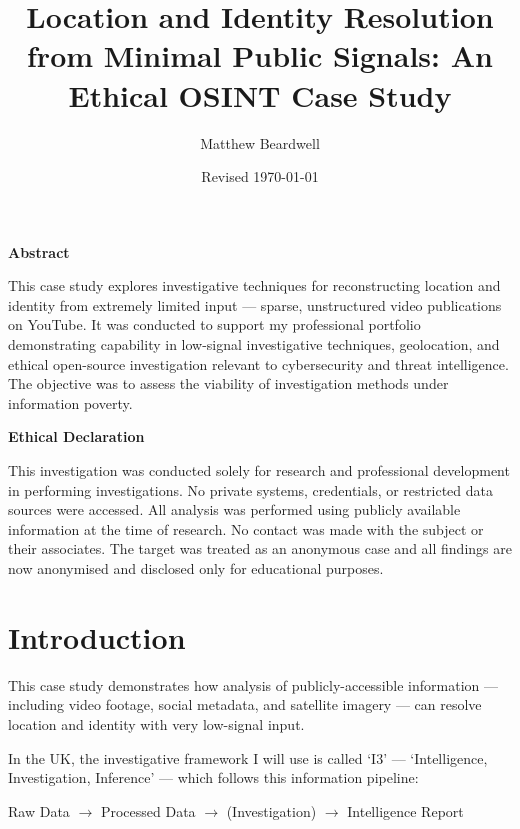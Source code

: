 \documentclass[a4paper,11pt]{report}
\title{Location and Identity Resolution from Minimal Public Signals: An Ethical OSINT Case Study}
\author{Matthew Beardwell}
\date{Revised \normaldate\today}
\begin{document}
\maketitle

\begin{center}
    \textbf{Abstract}
\end{center}

This case study explores investigative techniques for reconstructing location and identity from extremely limited input --- sparse, unstructured video publications on YouTube. It was conducted to support my professional portfolio demonstrating capability in low-signal investigative techniques, geolocation, and ethical open-source investigation relevant to cybersecurity and threat intelligence. The objective was to assess the viability of investigation methods under information poverty.

\newpage

\begin{center}
    \textbf{Ethical Declaration}
\end{center}  

This investigation was conducted solely for research and professional development in performing investigations. No private systems, credentials, or restricted data sources were accessed. All analysis was performed using publicly available information at the time of research. No contact was made with the subject or their associates. The target was treated as an anonymous case and all findings are now anonymised and disclosed only for educational purposes.

\newpage

\tableofcontents

\chapter{Introduction}

This case study demonstrates how analysis of publicly-accessible information --- including video footage, social metadata, and satellite imagery --- can resolve location and identity with very low-signal input.

In the UK, the investigative framework I will use is called `I3' --- `Intelligence, Investigation, Inference' --- which follows this information pipeline:

\vspace{0.5cm}
\begin{center}
Raw Data $\rightarrow$ Processed Data $\rightarrow$ (Investigation) $\rightarrow$ Intelligence Report
\end{center}
\vspace{0.5cm}
\end{document}
